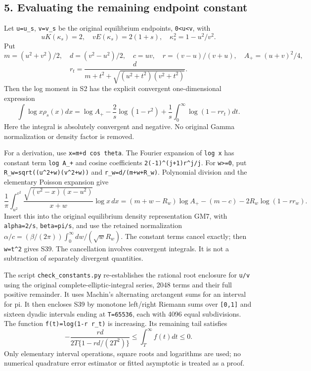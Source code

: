\subsection{5. Evaluating the remaining endpoint constant}\label{evaluating-the-remaining-endpoint-constant}

Let \texttt{u=u\_s}, \texttt{v=v\_s} be the original equilibrium endpoints, \texttt{0\textless{}u\textless{}v}, with \[
 uK(\kappa_s)=2,\quad vE(\kappa_s)=2(1+s),\quad
 \kappa_s^2=1-u^2/v^2.
\] Put \[
 m=(u^2+v^2)/2,\quad d=(v^2-u^2)/2,\quad c=uv,\quad
 r=(v-u)/(v+u),\quad A_+=(u+v)^2/4,
\] \[
 r_t=\frac{d}{m+t^2+\sqrt{(u^2+t^2)(v^2+t^2)}}.
\] Then the log moment in S2 has the explicit convergent one-dimensional expression \[
 \boxed{\int\log x\rho_s(x)dx
 =\log A_+-\frac2s\log(1-r^2)
       +\frac1s\int_0^\infty\log(1-r r_t)dt.}                     \tag{S39}
\] Here the integral is absolutely convergent and negative. No original Gamma normalization or density factor is removed.

For a derivation, use \texttt{x=m+d\ cos\ theta}. The Fourier expansion of \texttt{log\ x} has constant term \texttt{log\ A\_+} and cosine coefficients \nolinkurl{2(-1)^(j+1)r^j/j}. For \texttt{w\textgreater{}=0}, put \nolinkurl{R_w=sqrt((u^2+w)(v^2+w))} and \texttt{r\_w=d/(m+w+R\_w)}. Polynomial division and the elementary Poisson expansion give \[
 \frac1\pi\int_{u^2}^{v^2}
 \frac{\sqrt{(v^2-x)(x-u^2)}}{x+w}\log x\,dx
 =(m+w-R_w)\log A_+-(m-c)-2R_w\log(1-r r_w).                    \tag{S40}
\] Insert this into the original equilibrium density representation GM7, with \texttt{alpha=2/s}, \texttt{beta=pi/s}, and use the retained normalization \(\alpha/c=(\beta/(2\pi))\int_0^\infty dw/(\sqrt w R_w)\). The constant terms cancel exactly; then \texttt{w=t\^{}2} gives S39. The cancellation involves convergent integrals. It is not a subtraction of separately divergent quantities.

The script \nolinkurl{check_constants.py} re-establishes the rational root enclosure for \texttt{u/v} using the original complete-elliptic-integral series, 2048 terms and their full positive remainder. It uses Machin's alternating arctangent sums for an interval for pi. It then encloses S39 by monotone left/right Riemann sums over \texttt{{[}0,1{]}} and sixteen dyadic intervals ending at \texttt{T=65536}, each with 4096 equal subdivisions. The function \nolinkurl{f(t)=log(1-r r_t)} is increasing. Its remaining tail satisfies \[
 -\frac{rd}{2T\{1-rd/(2T^2)\}}\le\int_T^\infty f(t)dt\le0.        \tag{S41}
\] Only elementary interval operations, square roots and logarithms are used; no numerical quadrature error estimator or fitted asymptotic is treated as a proof.

